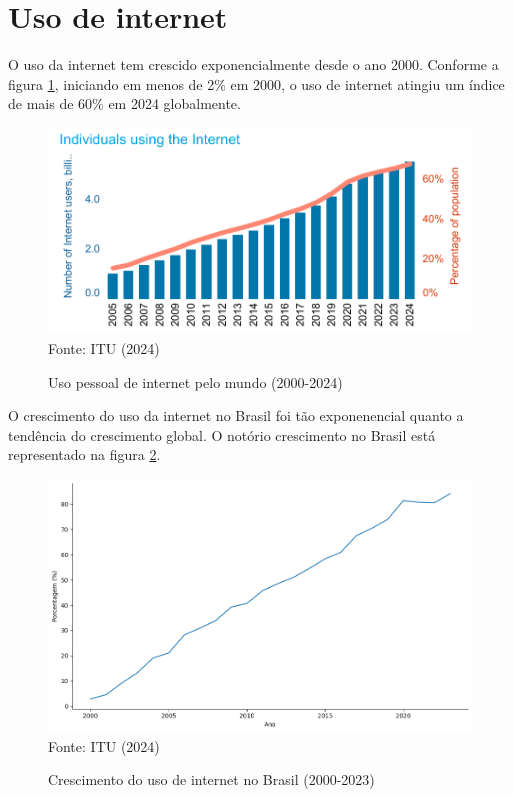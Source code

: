 \section{Uso de internet}

O uso da internet tem crescido exponencialmente desde o ano 2000. Conforme a figura \ref{fig:individuals_using_internet_itu}, iniciando em menos de 2\% em 2000, o uso de internet atingiu um índice de mais de 60\% em 2024 globalmente. 

\begin{figure}[ht]
    \centering
    \caption{Uso pessoal de internet pelo mundo (2000-2024)}
    \includegraphics[width=0.78\linewidth]{figuras/internet/individuals_using_internet_itu.png}
    \label{fig:individuals_using_internet_itu}
    \\ \footnotesize{Fonte: ITU (2024)}
\end{figure}

O crescimento do uso da internet no Brasil foi tão exponenencial quanto a tendência do crescimento global. O notório crescimento no Brasil está representado na figura \ref{fig:crescimento_internet_brasil_itu}.

\begin{figure}[ht]
    \centering
    \caption{Crescimento do uso de internet no Brasil (2000-2023)}
    \includegraphics[width=1\linewidth]{figuras/internet/lineplot_uso_internet_brasil_itu.png}
    \label{fig:crescimento_internet_brasil_itu}
    \footnotesize{Fonte: ITU (2024)}
\end{figure}

